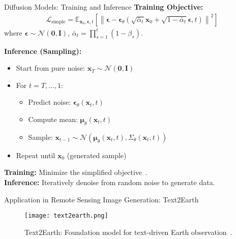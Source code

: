   \begin{refsection}
  \begin{frame}{Diffusion Models: Training and Inference}
    \footnotesize
    \textbf{Training Objective:}
    \begin{align*}
      \mathcal{L}_{\mathrm{simple}} = \mathbb{E}_{\mathbf{x}_0, \boldsymbol{\epsilon}, t} \left[ \left\| \boldsymbol{\epsilon} - \boldsymbol{\epsilon}_\theta(\sqrt{\bar{\alpha}_t}\mathbf{x}_0 + \sqrt{1-\bar{\alpha}_t}\boldsymbol{\epsilon}, t) \right\|^2 \right]
    \end{align*}
    where $\boldsymbol{\epsilon} \sim \mathcal{N}(\mathbf{0}, \mathbf{I})$, $\bar{\alpha}_t = \prod_{s=1}^t (1-\beta_s)$.
  
    \vspace{0.5em}
    \textbf{Inference (Sampling):}
    \begin{itemize}
      \item Start from pure noise: $\mathbf{x}_T \sim \mathcal{N}(\mathbf{0}, \mathbf{I})$
      \item For $t = T, \ldots, 1$:
        \begin{itemize}
          \item Predict noise: $\boldsymbol{\epsilon}_\theta(\mathbf{x}_t, t)$
          \item Compute mean: $\boldsymbol{\mu}_\theta(\mathbf{x}_t, t)$
          \item Sample: $\mathbf{x}_{t-1} \sim \mathcal{N}(\boldsymbol{\mu}_\theta(\mathbf{x}_t, t), \Sigma_\theta(\mathbf{x}_t, t))$
        \end{itemize}
      \item Repeat until $\mathbf{x}_0$ (generated sample)
    \end{itemize}
  
    \vspace{0.5em}
    \scriptsize
    \textbf{Training:} Minimize the simplified objective~\parencite{ho2020denoising}.\\
    \textbf{Inference:} Iteratively denoise from random noise to generate data.
    \bottomleftrefs
  \end{frame}
  \end{refsection}
  
  
  \begin{refsection}
    \begin{frame}{Application in Remote Sensing Image Generation: Text2Earth}
      \begin{figure}
        \centering
        \texttt{[image: text2earth.png]}
        \caption[]{\scriptsize Text2Earth: Foundation model for text-driven Earth observation~\parencite{text2earth2025}.}
      \end{figure}
      \bottomleftrefs
    \end{frame}
  \end{refsection}
  
